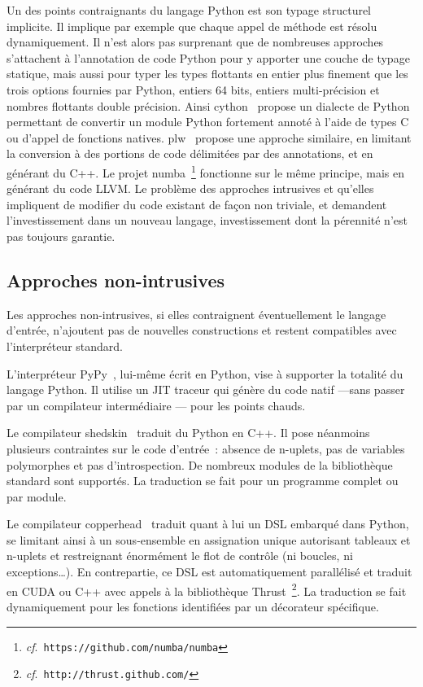 \documentclass[renpar]{compas2013}
\begin{document}
Un des points contraignants du langage Python est son typage structurel
implicite. Il implique par exemple que chaque appel de méthode est résolu
dynamiquement. Il n'est alors pas surprenant que de nombreuses approches
s'attachent à l'annotation de code Python pour y apporter une couche de
typage statique, mais aussi pour typer les types flottants en entier plus
finement que les trois options fournies par Python, entiers 64 bits,
entiers multi-précision et nombres flottants double précision. Ainsi
cython~\cite{cython2010} propose un dialecte de Python permettant de
convertir un module Python fortement annoté à l'aide de types C ou d'appel
de fonctions natives. plw~\cite{dongara2007} propose une approche
similaire, en limitant la conversion à des portions de code délimitées par
des annotations, et en générant du C++. Le projet
numba~\footnote{\emph{cf}.\ \texttt{https://github.com/numba/numba}}
fonctionne sur le même principe, mais en générant du code LLVM.  Le
problème des approches intrusives et qu'elles impliquent de modifier du
code existant de façon non triviale, et demandent l'investissement dans un
nouveau langage, investissement dont la pérennité n'est pas toujours
garantie.

\subsection{Approches non-intrusives}

Les approches non-intrusives, si elles contraignent éventuellement le
langage d'entrée, n'ajoutent pas de nouvelles constructions et restent
compatibles avec l'interpréteur standard.

L'interpréteur PyPy~\cite{pypy2009}, lui-même écrit en Python, vise à
supporter la totalité du langage Python. Il utilise un JIT traceur qui
génère du code natif ---sans passer par un compilateur intermédiaire ---
pour les points chauds.

Le compilateur shedskin~\cite{shedskin2006} traduit du Python en C++. Il
pose néanmoins plusieurs contraintes sur le code d'entrée~: absence de
n-uplets, pas de variables polymorphes et pas d'introspection. De nombreux
modules de la bibliothèque standard sont supportés. La traduction se fait
pour un programme complet ou par module.

Le compilateur copperhead~\cite{copperhead2011} traduit quant à lui un DSL
embarqué dans Python, se limitant ainsi à un sous-ensemble en assignation
unique autorisant tableaux et n-uplets et restreignant énormément le flot
de contrôle (ni boucles, ni exceptions\dots). En contrepartie, ce DSL est
automatiquement parallélisé et traduit en CUDA ou C++ avec appels à la
bibliothèque Thrust~\footnote{\emph{cf}.\
\texttt{http://thrust.github.com/}}. La traduction se fait dynamiquement
pour les fonctions identifiées par un décorateur spécifique.
\end{document}
